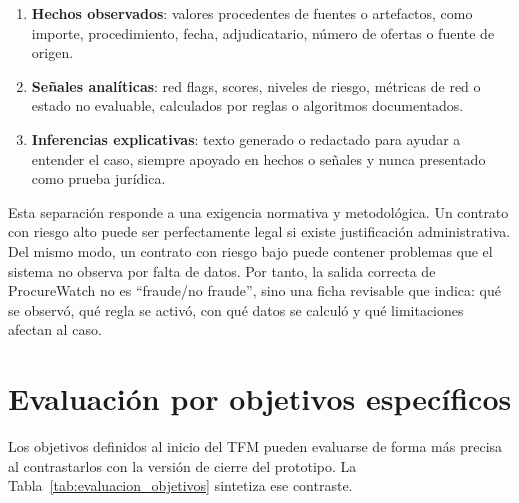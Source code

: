 \documentclass[11pt,a4paper,spanish]{book}
\numberwithin{equation}{chapter}
\numberwithin{figure}{chapter}
\begin{document}
\begin{enumerate}
  \item \textbf{Hechos observados}: valores procedentes de fuentes o artefactos, como importe,
  procedimiento, fecha, adjudicatario, n{\'u}mero de ofertas o fuente de origen.
  \item \textbf{Se{\~n}ales anal{\'i}ticas}: red flags, scores, niveles de riesgo, m{\'e}tricas de red o
  estado no evaluable, calculados por reglas o algoritmos documentados.
  \item \textbf{Inferencias explicativas}: texto generado o redactado para ayudar a entender el caso,
  siempre apoyado en hechos o se{\~n}ales y nunca presentado como prueba jur{\'i}dica.
\end{enumerate}

Esta separaci{\'o}n responde a una exigencia normativa y metodol{\'o}gica. Un contrato con riesgo alto
puede ser perfectamente legal si existe justificaci{\'o}n administrativa. Del mismo modo, un contrato
con riesgo bajo puede contener problemas que el sistema no observa por falta de datos. Por tanto,
la salida correcta de ProcureWatch no es ``fraude/no fraude'', sino una ficha revisable que indica:
qu{\'e} se observ{\'o}, qu{\'e} regla se activ{\'o}, con qu{\'e} datos se calcul{\'o} y qu{\'e} limitaciones
afectan al caso.

\section{Evaluaci{\'o}n por objetivos espec{\'i}ficos}
\label{sec:evaluacion_por_objetivos}

Los objetivos definidos al inicio del TFM pueden evaluarse de forma m{\'a}s precisa al contrastarlos
con la versi{\'o}n de cierre del prototipo. La Tabla~\ref{tab:evaluacion_objetivos} sintetiza ese contraste.
\end{document}
